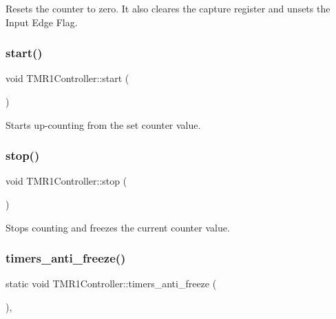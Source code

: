 Resets the counter to zero. It also cleares the capture register and unsets the Input Edge Flag. 

\mbox{\label{classTMR1Controller_a67bc04f0648176a681f6ac01ea483db9}} 
\subsubsection{\texorpdfstring{start()}{start()}}
{\footnotesize\ttfamily void T\+M\+R1\+Controller\+::start (\begin{DoxyParamCaption}{ }\end{DoxyParamCaption})\hspace{0.3cm}{\ttfamily [inline]}}



Starts up-\/counting from the set counter value. 

\mbox{\label{classTMR1Controller_afcb0ea27107bfbe50b9dcbd54207dd00}} 
\subsubsection{\texorpdfstring{stop()}{stop()}}
{\footnotesize\ttfamily void T\+M\+R1\+Controller\+::stop (\begin{DoxyParamCaption}{ }\end{DoxyParamCaption})\hspace{0.3cm}{\ttfamily [inline]}}



Stops counting and freezes the current counter value. 

\mbox{\label{classTMR1Controller_acb383aa5321f552f018e4e217e2211f4}} 
\subsubsection{\texorpdfstring{timers\+\_\+anti\+\_\+freeze()}{timers\_anti\_freeze()}}
{\footnotesize\ttfamily static void T\+M\+R1\+Controller\+::timers\+\_\+anti\+\_\+freeze (\begin{DoxyParamCaption}{ }\end{DoxyParamCaption})\hspace{0.3cm}{\ttfamily [inline]}, {\ttfamily [static]}}



